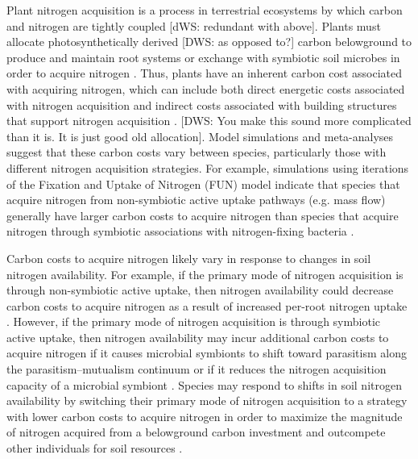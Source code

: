 Plant nitrogen acquisition is a process in terrestrial ecosystems by which carbon and nitrogen are tightly coupled  [dWS: redundant with above]. Plants must allocate photosynthetically derived [DWS: as opposed to?] carbon belowground to produce and maintain root systems or exchange with symbiotic soil microbes in order to acquire nitrogen . Thus, plants have an inherent carbon cost associated with acquiring nitrogen, which can include both direct energetic costs associated with nitrogen acquisition and indirect costs associated with building structures that support nitrogen acquisition . [DWS: You make this sound more complicated than it is. It is just good old allocation]. Model simulations  and meta-analyses  suggest that these carbon costs vary between species, particularly those with different nitrogen acquisition strategies. For example, simulations using iterations of the Fixation and Uptake of Nitrogen (FUN) model indicate that species that acquire nitrogen from non-symbiotic active uptake pathways (e.g. mass flow) generally have larger carbon costs to acquire nitrogen than species that acquire nitrogen through symbiotic associations with nitrogen-fixing bacteria .

Carbon costs to acquire nitrogen likely vary in response to changes in soil nitrogen availability. For example, if the primary mode of nitrogen acquisition is through non-symbiotic active uptake, then nitrogen availability could decrease carbon costs to acquire nitrogen as a result of increased per-root nitrogen uptake . However, if the primary mode of nitrogen acquisition is through symbiotic active uptake, then nitrogen availability may incur additional carbon costs to acquire nitrogen if it causes microbial symbionts to shift toward parasitism along the parasitism–mutualism continuum  or if it reduces the nitrogen acquisition capacity of a microbial symbiont . Species may respond to shifts in soil nitrogen availability by switching their primary mode of nitrogen acquisition to a strategy with lower carbon costs to acquire nitrogen in order to maximize the magnitude of nitrogen acquired from a belowground carbon investment and outcompete other individuals for soil resources .

